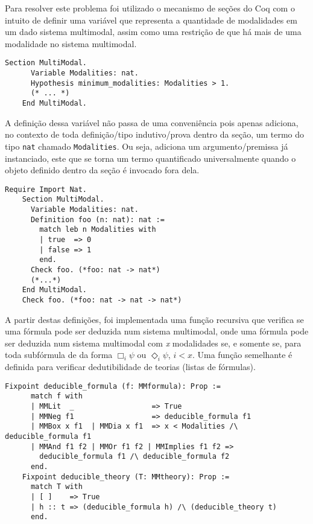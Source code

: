       Para resolver este problema foi utilizado o mecanismo de seções do Coq com o intuito de definir uma variável que representa a quantidade de modalidades em um dado sistema multimodal,
      assim como uma restrição de que há mais de uma modalidade no sistema multimodal.

      \begin{lstlisting}[language=coq]
    Section MultiModal.
      Variable Modalities: nat.
      Hypothesis minimum_modalities: Modalities > 1.
      (* ... *)
    End MultiModal.
      \end{lstlisting}
      A definição dessa variável não passa de uma conveniência pois apenas adiciona, no contexto de toda definição/tipo indutivo/prova dentro da seção, um termo do tipo \texttt{nat}
      chamado \texttt{Modalities}. Ou seja, adiciona um argumento/premissa já instanciado, este que se torna um termo quantificado universalmente quando o objeto definido dentro da seção é invocado fora dela.
      \begin{lstlisting}[language=coq]
    Require Import Nat.
    Section MultiModal.
      Variable Modalities: nat.
      Definition foo (n: nat): nat :=
        match leb n Modalities with
        | true  => 0
        | false => 1
        end.
      Check foo. (*foo: nat -> nat*)
      (*...*)
    End MultiModal.
    Check foo. (*foo: nat -> nat -> nat*)
      \end{lstlisting}

      A partir destas definições, foi implementada uma função recursiva que verifica se uma fórmula pode ser deduzida num sistema multimodal, onde uma fórmula \PHI pode ser deduzida num
      sistema multimodal com \textit{x} modalidades se, e somente se, para toda subfórmula de \PHI da forma \(\Box_{i} \psi\) ou \(\Diamond_{i} \psi\), \(i < x\).
      Uma função semelhante é definida para verificar dedutibilidade de teorias (listas de fórmulas).
      \begin{lstlisting}[language=coq]
    Fixpoint deducible_formula (f: MMformula): Prop :=
      match f with
      | MMLit  _                  => True
      | MMNeg f1                  => deducible_formula f1
      | MMBox x f1  | MMDia x f1  => x < Modalities /\ deducible_formula f1
      | MMAnd f1 f2 | MMOr f1 f2 | MMImplies f1 f2 =>
        deducible_formula f1 /\ deducible_formula f2
      end.
    Fixpoint deducible_theory (T: MMtheory): Prop :=
      match T with
      | [ ]    => True
      | h :: t => (deducible_formula h) /\ (deducible_theory t)
      end.
      \end{lstlisting}

